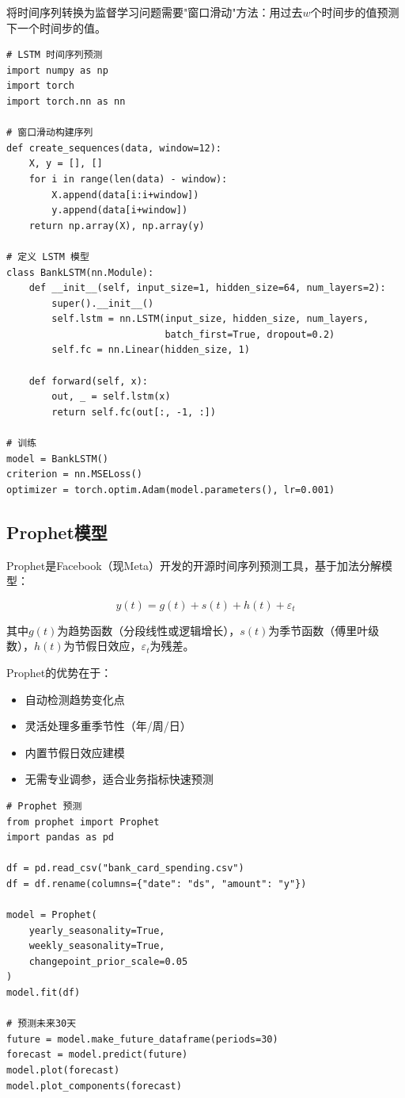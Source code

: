 将时间序列转换为监督学习问题需要"窗口滑动"方法：用过去$w$个时间步的值预测下一个时间步的值。

\begin{lstlisting}[style=python]
# LSTM 时间序列预测
import numpy as np
import torch
import torch.nn as nn

# 窗口滑动构建序列
def create_sequences(data, window=12):
    X, y = [], []
    for i in range(len(data) - window):
        X.append(data[i:i+window])
        y.append(data[i+window])
    return np.array(X), np.array(y)

# 定义 LSTM 模型
class BankLSTM(nn.Module):
    def __init__(self, input_size=1, hidden_size=64, num_layers=2):
        super().__init__()
        self.lstm = nn.LSTM(input_size, hidden_size, num_layers,
                            batch_first=True, dropout=0.2)
        self.fc = nn.Linear(hidden_size, 1)

    def forward(self, x):
        out, _ = self.lstm(x)
        return self.fc(out[:, -1, :])

# 训练
model = BankLSTM()
criterion = nn.MSELoss()
optimizer = torch.optim.Adam(model.parameters(), lr=0.001)
\end{lstlisting}

\subsection{Prophet模型}

Prophet是Facebook（现Meta）开发的开源时间序列预测工具，基于加法分解模型：

\[
y(t) = g(t) + s(t) + h(t) + \varepsilon_t
\]

其中$g(t)$为趋势函数（分段线性或逻辑增长），$s(t)$为季节函数（傅里叶级数），$h(t)$为节假日效应，$\varepsilon_t$为残差。

Prophet的优势在于：
\begin{itemize}[leftmargin=2em]
  \item 自动检测趋势变化点
  \item 灵活处理多重季节性（年/周/日）
  \item 内置节假日效应建模
  \item 无需专业调参，适合业务指标快速预测
\end{itemize}

\begin{lstlisting}[style=python]
# Prophet 预测
from prophet import Prophet
import pandas as pd

df = pd.read_csv("bank_card_spending.csv")
df = df.rename(columns={"date": "ds", "amount": "y"})

model = Prophet(
    yearly_seasonality=True,
    weekly_seasonality=True,
    changepoint_prior_scale=0.05
)
model.fit(df)

# 预测未来30天
future = model.make_future_dataframe(periods=30)
forecast = model.predict(future)
model.plot(forecast)
model.plot_components(forecast)
\end{lstlisting}

